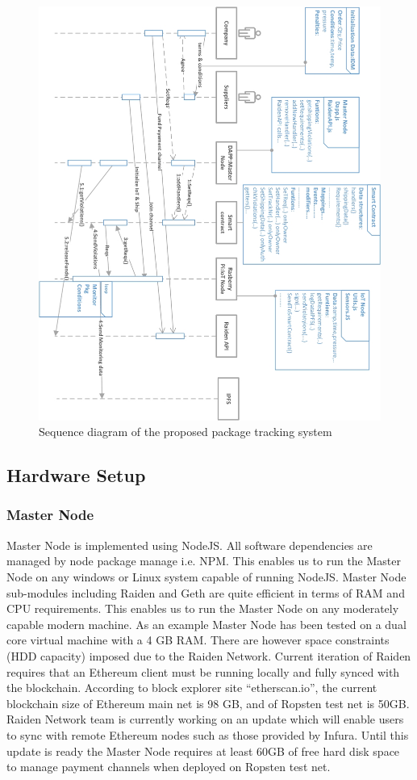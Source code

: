 \begin{figure}[h]
	\centering
    \includegraphics[width=180mm,scale=1]{figs/SD-Flip}
	\caption{Sequence diagram of the proposed package tracking system}
	\label{fig:SysSD} 
\end{figure}
\clearpage

\subsection{Hardware Setup}
\subsubsection{Master Node}
Master Node is implemented using NodeJS. All software dependencies are managed by node package manage i.e. NPM. This enables us to run the Master Node on any windows or Linux system capable of running NodeJS. Master Node sub-modules including Raiden and Geth are quite efficient in terms of RAM and CPU requirements. This enables us to run the Master Node on any moderately capable modern machine. As an example Master Node has been tested on a dual core virtual machine with a 4 GB RAM. There are however space constraints (HDD capacity) imposed due to the Raiden Network. Current iteration of Raiden requires that an Ethereum client must be running locally and fully synced with the blockchain. According to block explorer site “etherscan.io”, the current blockchain size of Ethereum main net is 98 GB, and of Ropsten test net is 50GB. Raiden Network team is currently working on an update which will enable users to sync with remote Ethereum nodes such as those provided by Infura. Until this update is ready the Master Node requires at least 60GB of free hard disk space to manage payment channels when deployed on Ropsten test net. 
